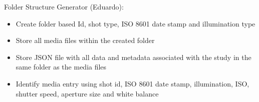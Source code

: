 Folder Structure Generator (Eduardo):
\begin{itemize}
	\item Create folder based Id, shot type, ISO 8601 date stamp and illumination type
	\item Store all media files within the created folder
	\item Store JSON file with all data and metadata associated with the study in the same folder as the media files
	\item Identify media entry using shot id, ISO 8601 date stamp, illumination, ISO, shutter speed, aperture size and white balance
\end{itemize}